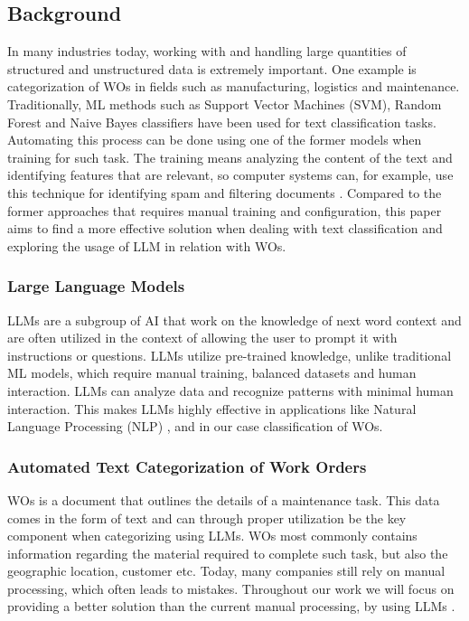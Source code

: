 \documentclass{article}
\begin{document}
\subsection{Background}

In many industries today, working with and handling large quantities of structured and unstructured data is
extremely important.
One example is categorization of WOs in fields such as manufacturing, logistics and maintenance.
Traditionally, ML methods such as Support Vector Machines (SVM), Random Forest and Naive Bayes classifiers
have been used for text classification tasks.
Automating this process can be done using one of the former models when training for such task.
The training means analyzing the content of the text and identifying features that are relevant,
so computer systems can, for example, use this technique for identifying spam and filtering documents \cite{dalal2011}.
Compared to the former approaches that requires manual training and configuration,
this paper aims to find a more effective solution when dealing with text classification
and exploring the usage of LLM in relation with WOs.

\subsubsection{Large Language Models}

LLMs are a subgroup of AI that work on the knowledge of next word context and are often utilized
in the context of allowing the user to prompt it with instructions or questions.
LLMs utilize pre-trained knowledge, unlike traditional ML models, which require manual training,
balanced datasets and human interaction.
LLMs can analyze data and recognize patterns with minimal human interaction.
This makes LLMs highly effective in applications like Natural Language Processing (NLP) \cite{andersson2024},
and in our case classification of WOs.

\subsubsection{Automated Text Categorization of Work Orders}

WOs is a document that outlines the details of a maintenance task.
This data comes in the form of text and can through proper utilization be the key component when categorizing using LLMs.
WOs most commonly contains information regarding the material required to complete such task,
but also the geographic location, customer etc.
Today, many companies still rely on manual processing, which often leads to mistakes.
Throughout our work we will focus on providing a better solution than the current manual processing,
by using LLMs \cite{ibm2023} \cite{li2024}.
\end{document}
